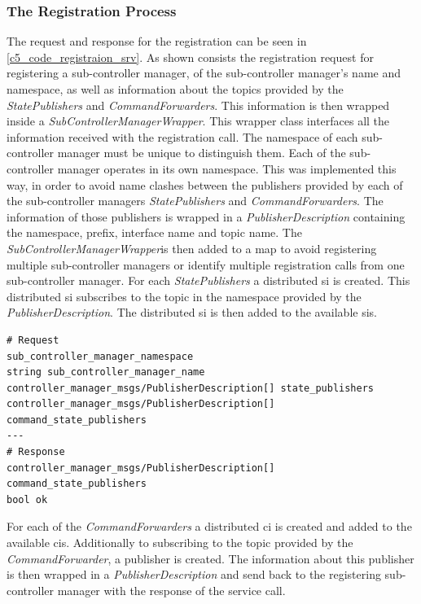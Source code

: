 \subsubsection{The Registration Process}
The request and response for the registration can be seen in \autoref{c5_code_registraion_srv}. As shown consists the registration request for registering a sub-controller manager, of the sub-controller manager's name and namespace, as well as information about the topics provided by the \textit{StatePublishers} and \textit{CommandForwarders}. This information is then wrapped inside a \textit{SubControllerManagerWrapper}. This wrapper class interfaces all the information received with the registration call. The namespace of each sub-controller manager must be unique to distinguish them. Each of the sub-controller manager operates in its own namespace. This was implemented this way, in order to avoid name clashes between the publishers provided by each of the sub-controller managers \textit{StatePublishers} and \textit{CommandForwarders}. The information of those publishers is wrapped in a \textit{PublisherDescription} containing the namespace, prefix, interface name and topic name. The  \textit{SubControllerManagerWrapper}is then added to a map to avoid registering multiple sub-controller managers or identify multiple registration calls from one sub-controller manager.\newline
For each \textit{StatePublishers} a distributed \gls{si} is created. This distributed \gls{si} subscribes to the topic in the namespace provided by the \textit{PublisherDescription}. The distributed \gls{si} is then added to the available \glspl{si}.
\lstset{language=C++,basicstyle=\small}
\begin{lstlisting}[caption=Request and response of the registraion service.,label=c5_code_registraion_srv]
# Request
sub_controller_manager_namespace
string sub_controller_manager_name
controller_manager_msgs/PublisherDescription[] state_publishers
controller_manager_msgs/PublisherDescription[] command_state_publishers
---
# Response
controller_manager_msgs/PublisherDescription[] command_state_publishers
bool ok
\end{lstlisting}
For each of the \textit{CommandForwarders} a distributed \gls{ci} is created and added to the available \glspl{ci}. Additionally to subscribing to the topic provided by the \textit{CommandForwarder}, a publisher is created. The information about this publisher is then wrapped in a \textit{PublisherDescription} and send back to the registering sub-controller manager with the response of the service call. 

